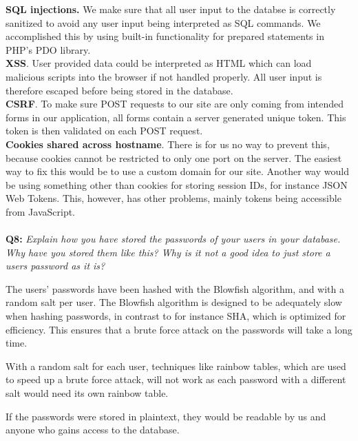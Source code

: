 \textbf{SQL injections.} We make sure that all user input to the databse is correctly sanitized to avoid any user input being interpreted as SQL commands.
We accomplished this by using built-in functionality for prepared statements in PHP's PDO library\cite{pdo}. \\
\textbf{XSS}. User provided data could be interpreted as HTML which can load malicious scripts into the browser if not handled properly.
All user input is therefore escaped before being stored in the database. \\
\textbf{CSRF}. To make sure POST requests to our site are only coming from intended forms in our application, all forms contain a server generated unique token.
This token is then validated on each POST request. \\
\textbf{Cookies shared across hostname}. There is for us no way to prevent this, because cookies cannot be restricted to only one port on the server.
The easiest way to fix this would be to use a custom domain for our site.
Another way would be using something other than cookies for storing session IDs, for instance JSON Web Tokens.
This, however, has other problems, mainly tokens being accessible from JavaScript.

\paragraph{}
\textbf{Q8:}
\textit{Explain how you have stored the passwords of your users in your database. Why have you stored them like this? Why is it not a good idea to just store a users password as it is?}

The users' passwords have been hashed with the Blowfish\cite{blowfish} algorithm, and with a random salt per user.
The Blowfish algorithm is designed to be adequately slow when hashing passwords, in contrast to for instance SHA, which is optimized for efficiency.
This ensures that a brute force attack on the passwords will take a long time.

With a random salt for each user, techniques like rainbow tables, which are used to speed up a brute force attack, will not work as each password with a different salt would need its own rainbow table.

If the passwords were stored in plaintext, they would be readable by us and anyone who gains access to the database.
